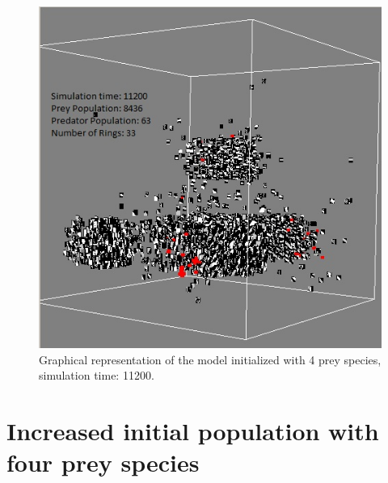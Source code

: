 \begin{figure}[H]
	\centering
	\label{fig:screenshot-simTime11K-4Prey}
	\includegraphics[scale=0.55]{images/simTime11K-4Prey}
	\caption[Graphical representation of the model (simulation time: 11200)]{Graphical representation of the model initialized with 4 prey species, simulation time: 11200.}
\end{figure}

\section{Increased initial population with four prey species}


